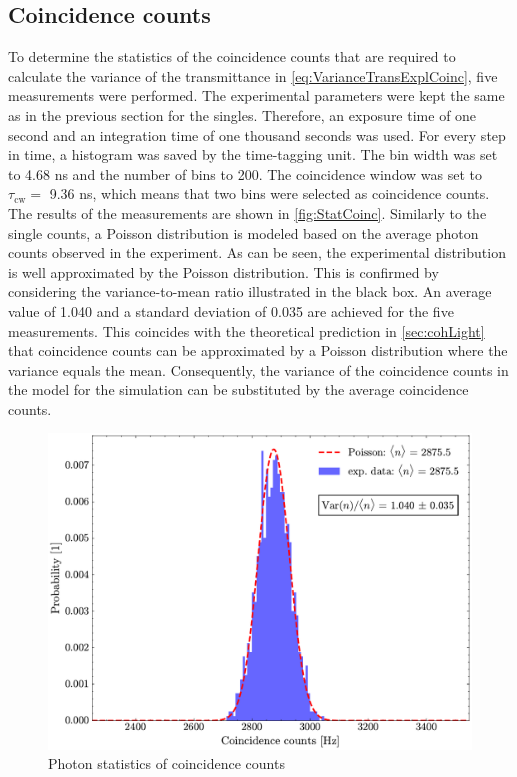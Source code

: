 \subsection{Coincidence counts}
To determine the statistics of the coincidence counts that are required to calculate the variance of the transmittance in \autoref{eq:VarianceTransExplCoinc}, five measurements were performed. The experimental parameters were kept the same as in the previous section for the singles. Therefore, an exposure time of one second and an integration time of one thousand seconds was used. For every step in time, a histogram was saved by the time-tagging unit. The bin width was set to 4.68 ns and the number of bins to 200. The coincidence window was set to $\tau_{\text{cw}} = $ 9.36 ns, which means that two bins were selected as coincidence counts.\newline
The results of the measurements are shown in \autoref{fig:StatCoinc}. Similarly to the single counts, a Poisson distribution is modeled based on the average photon counts observed in the experiment. As can be seen, the experimental distribution is well approximated by the Poisson distribution. This is confirmed by considering the variance-to-mean ratio illustrated in the black box. An average value of 1.040 and a standard deviation of 0.035 are achieved for the five measurements. This coincides with the theoretical prediction in \autoref{sec:cohLight} that coincidence counts can be approximated by a Poisson distribution where the variance equals the mean. \newline
Consequently, the variance of the coincidence counts in the model for the simulation can be substituted by the average coincidence counts.
\begin{figure}[tb!]
	\centering
	\includegraphics[width=.7\textwidth]{Images/CoincStatistics.pdf}
	\caption{Photon statistics of coincidence counts}
	\label{fig:StatCoinc}
\end{figure}

